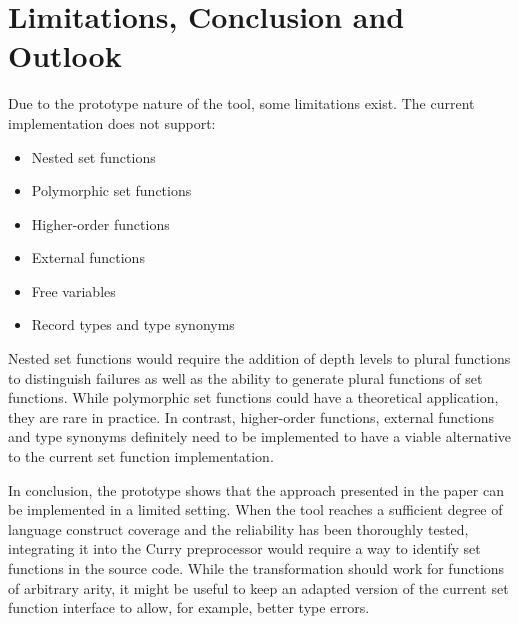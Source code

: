 \documentclass[a4paper, 11pt, fleqn]{scrreprt}
\begin{document}
\chapter{Limitations, Conclusion and Outlook}
Due to the prototype nature of the tool, some limitations exist. The current implementation does not support:
\begin{itemize}
    \item Nested set functions
    \item Polymorphic set functions
    \item Higher-order functions
    \item External functions
    \item Free variables
    \item Record types and type synonyms
\end{itemize}
Nested set functions would require the addition of depth levels to plural functions to distinguish failures as well as the ability to generate plural functions of set functions. While polymorphic set functions could have a theoretical application, they are rare in practice. In contrast, higher-order functions, external functions and type synonyms definitely need to be implemented to have a viable alternative to the current set function implementation.

In conclusion, the prototype shows that the approach presented in the paper can be implemented in a limited setting. When the tool reaches a sufficient degree of language construct coverage and the reliability has been thoroughly tested, integrating it into the Curry preprocessor would require a way to identify set functions in the source code. While the transformation should work for functions of arbitrary arity, it might be useful to keep an adapted version of the current set function interface to allow, for example, better type errors.





\appendix
\end{document}
